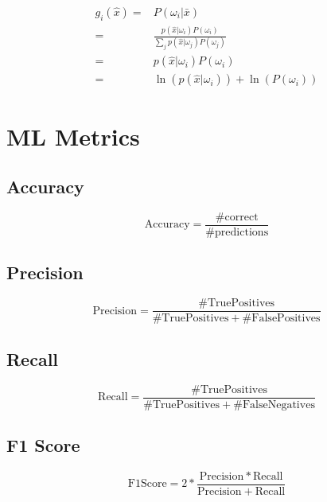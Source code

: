 \begin{subequations}
    \label{eq:discriminants}
    \begin{align}
        g_i(\hat{x}) =& P(\omega_i|\bar{x}) \\
                     =& \frac{p(\hat{x}|\omega_i)P(\omega_i)}{\sum_j p(\hat{x}|\omega_j)P(\omega_j)} \\
                     =& p(\hat{x}|\omega_i)P(\omega_i) \\
                     =& \ln\left(p\left(\hat{x}|\omega_i\right)\right) + \ln\left(P\left(\omega_i\right)\right)
    \end{align}
\end{subequations}

\section{ML Metrics}

\subsection{Accuracy}
\begin{equation}
    \mathrm{Accuracy} = \frac{\mathrm{\# correct}}{\mathrm{\# predictions}}
\end{equation}


\subsection{Precision}
\begin{equation}
    \mathrm{Precision} = \frac{\mathrm{\# True Positives}}{\mathrm{\# True Positives}+\mathrm{\# False Positives}}
\end{equation}

\subsection{Recall}
\begin{equation}
    \mathrm{Recall} = \frac{\mathrm{\# True Positives}}{\mathrm{\# True Positives}+\mathrm{\# False Negatives}}
\end{equation}

\subsection{F1 Score}
\begin{equation}
    \mathrm{F1 Score} = 2*\frac{\mathrm{Precision*Recall}}{\mathrm{Precision+Recall}}
\end{equation}



